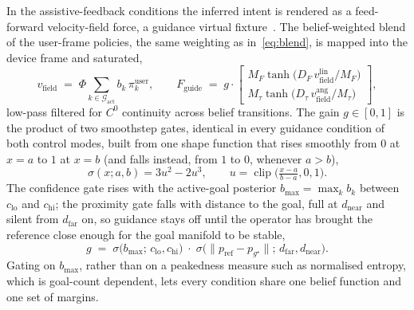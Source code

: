 \documentclass[12pt,a4paper,twoside,openright]{report}
\begin{document}
In the assistive-feedback conditions the inferred intent is rendered as a feed-forward velocity-field force, a guidance virtual fixture~\cite{rosenberg1993virtual,abbott2007haptic}. The belief-weighted blend of the user-frame policies, the same weighting as in~\eqref{eq:blend}, is mapped into the device frame and saturated,
\begin{equation}
v_{\text{field}} \;=\; \Phi\!\sum_{k \in \mathcal{G}_{\text{act}}} b_k\, \pi_k^{\text{user}},
\qquad
F_{\text{guide}} \;=\; g \cdot
\begin{bmatrix}
M_F \tanh\!\bigl(D_F\, v_{\text{field}}^{\text{lin}} / M_F\bigr)\\[2pt]
M_\tau \tanh\!\bigl(D_\tau\, v_{\text{field}}^{\text{ang}} / M_\tau\bigr)
\end{bmatrix},
\label{eq:fguide}
\end{equation}
low-pass filtered for $C^0$ continuity across belief transitions. The gain $g \in [0,1]$ is the product of two smoothstep gates, identical in every guidance condition of both control modes, built from one shape function that rises smoothly from $0$ at $x=a$ to $1$ at $x=b$ (and falls instead, from $1$ to $0$, whenever $a > b$),
\begin{equation}
\sigma(x; a, b) = 3u^2 - 2u^3,\qquad u = \operatorname{clip}\!\bigl(\tfrac{x-a}{b-a}, 0, 1\bigr).
\label{eq:smoothstep}
\end{equation}
The confidence gate rises with the active-goal posterior $b_{\max} = \max_k b_k$ between $c_{\text{lo}}$ and $c_{\text{hi}}$; the proximity gate falls with distance to the goal, full at $d_{\text{near}}$ and silent from $d_{\text{far}}$ on, so guidance stays off until the operator has brought the reference close enough for the goal manifold to be stable,
\begin{equation}
g \;=\; \sigma\!\bigl(b_{\max};\, c_{\text{lo}}, c_{\text{hi}}\bigr)\;\cdot\;\sigma\!\bigl(\|p_{\text{ref}} - p_{g^{\star}}\|;\, d_{\text{far}}, d_{\text{near}}\bigr).
\label{eq:guidegate}
\end{equation}
Gating on $b_{\max}$, rather than on a peakedness measure such as normalised entropy, which is goal-count dependent, lets every condition share one belief function and one set of margins.
\end{document}
